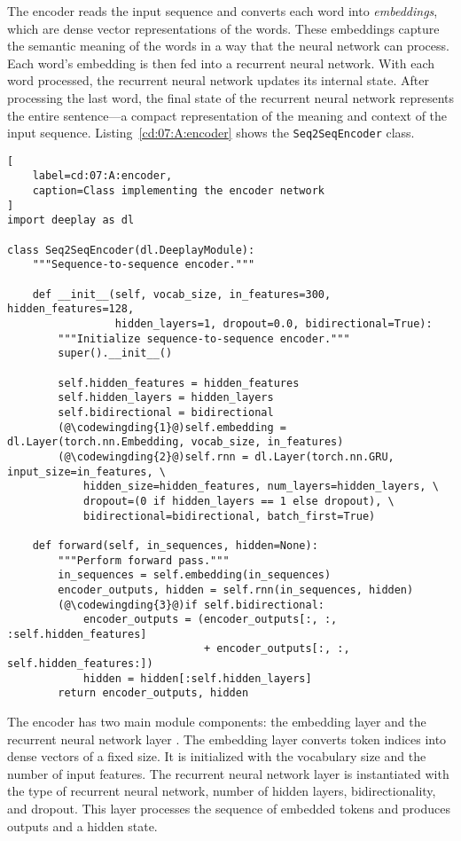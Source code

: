 The encoder reads the input sequence and converts each word into \emph{embeddings}, which are dense vector representations of the words. These embeddings capture the semantic meaning of the words in a way that the neural network can process. Each word's embedding is then fed into a recurrent neural network. With each word processed, the recurrent neural network updates its internal state. After processing the last word, the final state of the recurrent neural network represents the entire sentence---a compact representation of the meaning and context of the input sequence.
Listing~\ref{cd:07:A:encoder} shows the \lstinline{Seq2SeqEncoder} class.
\begin{lstlisting}[
    label=cd:07:A:encoder,
    caption=Class implementing the encoder network
]
import deeplay as dl

class Seq2SeqEncoder(dl.DeeplayModule):
    """Sequence-to-sequence encoder."""

    def __init__(self, vocab_size, in_features=300, hidden_features=128,
                 hidden_layers=1, dropout=0.0, bidirectional=True):
        """Initialize sequence-to-sequence encoder."""
        super().__init__()

        self.hidden_features = hidden_features
        self.hidden_layers = hidden_layers
        self.bidirectional = bidirectional
        (@\codewingding{1}@)self.embedding = dl.Layer(torch.nn.Embedding, vocab_size, in_features)
        (@\codewingding{2}@)self.rnn = dl.Layer(torch.nn.GRU, input_size=in_features, \
            hidden_size=hidden_features, num_layers=hidden_layers, \
            dropout=(0 if hidden_layers == 1 else dropout), \
            bidirectional=bidirectional, batch_first=True)

    def forward(self, in_sequences, hidden=None):
        """Perform forward pass."""
        in_sequences = self.embedding(in_sequences)
        encoder_outputs, hidden = self.rnn(in_sequences, hidden)
        (@\codewingding{3}@)if self.bidirectional:
            encoder_outputs = (encoder_outputs[:, :, :self.hidden_features]
                               + encoder_outputs[:, :, self.hidden_features:])
            hidden = hidden[:self.hidden_layers]
        return encoder_outputs, hidden
\end{lstlisting}
The encoder has two main module components: the embedding layer  and the recurrent neural network layer . 
The embedding layer converts token indices into dense vectors of a fixed size. It is initialized with the vocabulary size and the number of input features. The recurrent neural network layer is instantiated with the type of recurrent neural network, number of hidden layers, bidirectionality, and dropout. This layer processes the sequence of embedded tokens and produces outputs and a hidden state.

